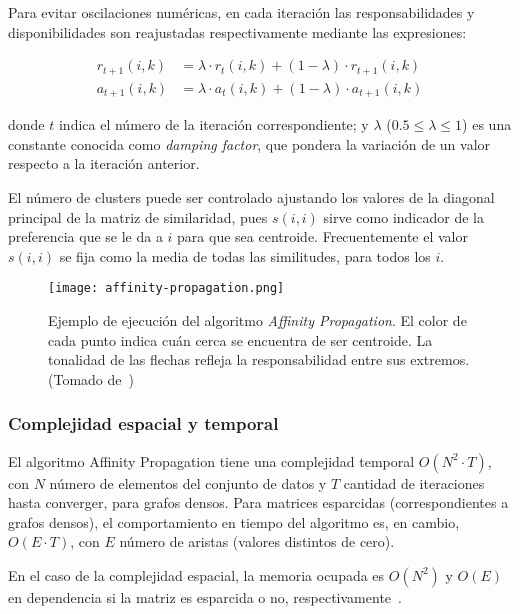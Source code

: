 Para evitar oscilaciones numéricas, en cada iteración las responsabilidades y disponibilidades son reajustadas respectivamente mediante las expresiones:

\begin{align}
    \label{eq:responsibility-damping}
    r_{t+1}(i,k) &= \lambda \cdot r_t (i,k) + (1-\lambda)\cdot r_{t+1}(i,k) \\
    \label{eq:availability-damping}
    a_{t+1}(i,k) &= \lambda \cdot a_t (i,k) + (1-\lambda)\cdot a_{t+1}(i,k)
\end{align}

\noindent
donde $t$ indica el número de la iteración correspondiente;
y $\lambda$ ($0.5 \leq \lambda \leq 1$) es una constante conocida como \textit{damping factor}, que pondera la variación de un valor respecto a la iteración anterior.

El número de clusters puede ser controlado ajustando los valores de la diagonal principal de la matriz de similaridad, pues $s(i,i)$ sirve como indicador de la preferencia que se le da a $i$ para que sea centroide.
Frecuentemente el valor $s(i,i)$ se fija como la media de todas las similitudes, para todos los $i$.

\begin{figure}[!h]
    \centering
    \texttt{[image: affinity-propagation.png]}
    \caption{Ejemplo de ejecución del algoritmo \textit{Affinity Propagation}. El color de cada punto indica cuán cerca se encuentra de ser centroide. La tonalidad de las flechas refleja la responsabilidad entre sus extremos. (Tomado de~\cite{Murphy12})}
    \label{img:affinity-propagation}
\end{figure}

\subsubsection{Complejidad espacial y temporal}


El algoritmo Affinity Propagation tiene una complejidad temporal $O(N^2 \cdot T)$, con $N$ número de elementos del conjunto de datos y $T$ cantidad de iteraciones hasta converger, para grafos densos.
Para matrices esparcidas (correspondientes a grafos densos), el comportamiento en tiempo del algoritmo es, en cambio, $O(E\cdot T)$, con $E$ número de aristas (valores distintos de cero).

En el caso de la complejidad espacial, la memoria ocupada es $O(N^2)$ y $O(E)$ en dependencia si la matriz es esparcida o no, respectivamente~\cite{Murphy12}.

